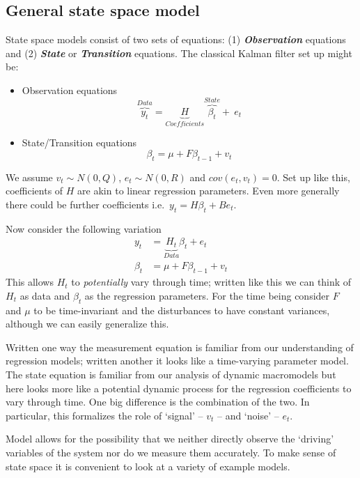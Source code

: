 \documentclass[
  letterpaper,
]{book}
\providecommand{\tightlist}{%
  \setlength{\itemsep}{0pt}\setlength{\parskip}{0pt}}\usepackage{longtable,booktabs,array}
\begin{document}
\hypertarget{general-state-space-model}{%
\subsection{General state space model}\label{general-state-space-model}}

State space models consist of two sets of equations: (1)
\textbf{\emph{Observation}} equations and (2) \textbf{\emph{State}} or
\textbf{\emph{Transition}} equations. The classical Kalman filter set up
might be:

\begin{itemize}
\tightlist
\item
  Observation equations \[
  \overbrace{y_t}^{Data} = \underbrace{H}_{Coefficients}  \overbrace{\beta_t}^{State} +\ e_t
  \]
\item
  State/Transition equations \[
   \beta_t = \mu + F\beta_{t-1} + v_t
  \]
\end{itemize}

We assume \(v_t\sim N(0,Q)\), \(e_t\sim N(0,R)\) and \(cov(e_t,v_t)=0\).
Set up like this, coefficients of \(H\) are akin to linear regression
parameters. Even more generally there could be further coefficients
i.e.~\(y_t = H \beta_t + B e_t\).

Now consider the following variation \[
    \begin{align*}
    y_t    &= \underbrace{H_t}_{Data} \beta_t + e_t \\
     \beta_t &= \mu + F \beta_{t-1} + v_t
    \end{align*}
\] This allows \(H_t\) to \emph{potentially} vary through time; written
like this we can think of \(H_t\) as data and \(\beta_t\) as the
regression parameters. For the time being consider \(F\) and \(\mu\) to
be time-invariant and the disturbances to have constant variances,
although we can easily generalize this.

Written one way the measurement equation is familiar from our
understanding of regression models; written another it looks like a
time-varying parameter model. The state equation is familiar from our
analysis of dynamic macromodels but here looks more like a potential
dynamic process for the regression coefficients to vary through time.
One big difference is the combination of the two. In particular, this
formalizes the role of `signal' -- \(v_t\) -- and `noise' -- \(e_t\).

Model allows for the possibility that we neither directly observe the
`driving' variables of the system nor do we measure them accurately. To
make sense of state space it is convenient to look at a variety of
example models.
\end{document}
